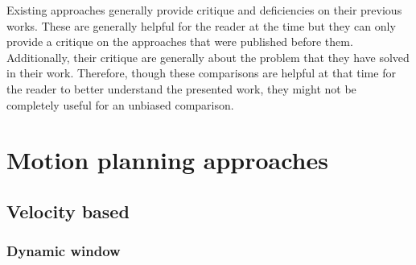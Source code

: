 Existing approaches generally provide critique and deficiencies on their previous works. These are generally helpful for the reader at the time but they can only provide a critique on the approaches that were published before them. Additionally, their critique are generally about the problem that they have solved in their work. Therefore, though these comparisons are helpful at that time for the reader to better understand the presented work, they might not be completely useful for an unbiased comparison.

\newpage{}
\section{Motion planning approaches}%
\label{sec:motion_planning_approaches}

\subsection{Velocity based}%
\label{sub:velocity_based}

\subsubsection{Dynamic window}%
\label{subsub:dynamic_window}

